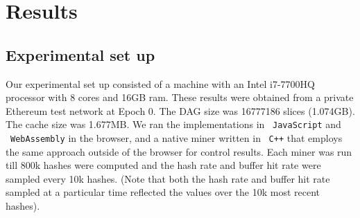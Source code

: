 \documentclass[runningheads]{llncs}
\begin{document}




\section{Results}
\label{sec:results}
\subsection{Experimental set up}
Our experimental set up consisted of a machine with an Intel i7-7700HQ processor with 8 cores and 16GB ram. These results were obtained from a private Ethereum test network at Epoch 0. The DAG size was 16777186 slices (1.074GB). The cache size was 1.677MB. We ran the implementations in ~\verb|JavaScript| and ~\verb|WebAssembly| in the browser, and a native miner written in ~\verb|C++| that employs the same approach outside of the browser for control results. Each miner was run till 800k hashes were computed and the hash rate and buffer hit rate were sampled every 10k hashes. (Note that both the hash rate and buffer hit rate sampled at a particular time reflected the values over the 10k most recent hashes).
\end{document}
